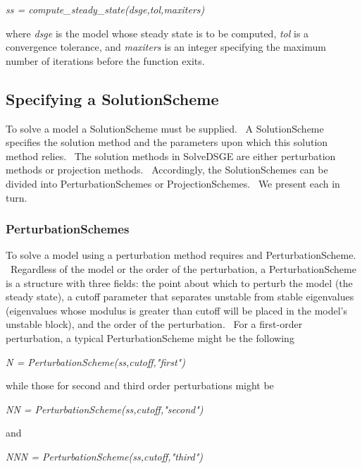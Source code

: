 \documentclass[notitlepage,11pt]{article}
\begin{document}
\textit{ss = compute\_steady\_state(dsge,tol,maxiters)}

\bigskip

where \textit{dsge} is the model whose steady state is to be computed, 
\textit{tol} is a convergence tolerance, and \textit{maxiters} is an integer
specifying the maximum number of iterations before the function exits.

\subsection{Specifying a SolutionScheme}

To solve a model a SolutionScheme must be supplied. \ A SolutionScheme
specifies the solution method and the parameters upon which this solution
method relies. \ The solution methods in SolveDSGE are either perturbation
methods or projection methods. \ Accordingly, the SolutionSchemes can be
divided into PerturbationSchemes or ProjectionSchemes. \ We present each in
turn.

\subsubsection{PerturbationSchemes}

To solve a model using a perturbation method requires and
PerturbationScheme. \ Regardless of the model or the order of the
perturbation, a PerturbationScheme is a structure with three fields: the
point about which to perturb the model (the steady state), a cutoff
parameter that separates unstable from stable eigenvalues (eigenvalues whose
modulus is greater than cutoff will be placed in the model's unstable
block), and the order of the perturbation. \ For a first-order perturbation,
a typical PerturbationScheme might be the following

\bigskip

\textit{N = PerturbationScheme(ss,cutoff,"first")}

\bigskip

while those for second and third order perturbations might be

\bigskip

\textit{NN = PerturbationScheme(ss,cutoff,"second")}

\bigskip

and

\bigskip

\textit{NNN = PerturbationScheme(ss,cutoff,"third")}

\bigskip
\end{document}
